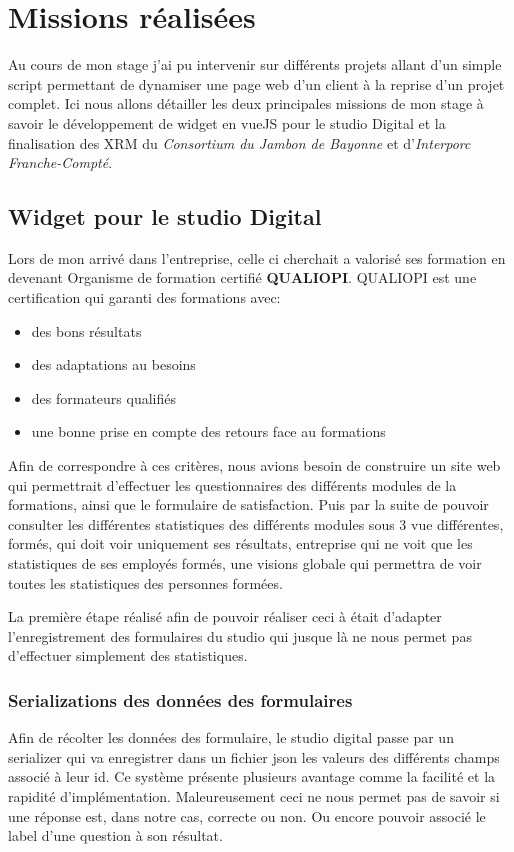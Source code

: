 \section{Missions réalisées}
Au cours de mon stage j'ai pu intervenir sur différents projets allant d'un simple script permettant de dynamiser une page web d'un client à la reprise d'un projet complet. Ici nous allons détailler les deux principales missions de mon stage à savoir le développement de widget en vueJS pour le studio Digital et la finalisation des XRM du \textit{Consortium du Jambon de Bayonne} et d'\textit{Interporc Franche-Compté}.

\subsection{Widget pour le studio Digital}
Lors de mon arrivé dans l'entreprise, celle ci cherchait a valorisé ses formation en devenant Organisme de formation certifié \textbf{QUALIOPI}. QUALIOPI est une certification qui garanti des formations avec: 
\begin{itemize}
    \item des bons résultats
    \item des adaptations au besoins
    \item des formateurs qualifiés
    \item une bonne prise en compte des retours face au formations
\end{itemize} 
Afin de correspondre à ces critères, nous avions besoin de construire un site web qui permettrait d'effectuer les questionnaires des différents modules de la formations, ainsi que le formulaire de satisfaction. Puis par la suite de pouvoir consulter les différentes statistiques des différents modules sous 3 vue différentes, formés, qui doit voir uniquement ses résultats, entreprise qui ne voit que les statistiques de ses employés formés, une visions globale qui permettra de voir toutes les statistiques des personnes formées.

La première étape réalisé afin de pouvoir réaliser ceci à était d'adapter l'enregistrement des formulaires du studio qui jusque là ne nous permet pas d'effectuer simplement des statistiques. 

\subsubsection{Serializations des données des formulaires}

Afin de récolter les données des formulaire, le studio digital passe par un serializer qui va enregistrer dans un fichier json les valeurs des différents champs associé à leur id. Ce système présente plusieurs avantage comme la facilité et la rapidité d'implémentation. Maleureusement ceci ne nous permet pas de savoir si une réponse est, dans notre cas, correcte ou non. Ou encore pouvoir associé le label d'une question à son résultat. 

